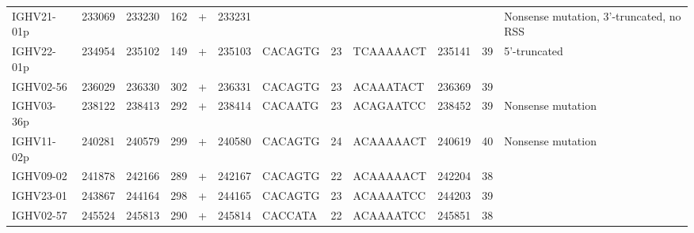 \begin{tabular}{lrrrlrlllrrp{4cm}}
  IGHV21-01p & 233069 & 233230 & 162 & + & 233231 &  &  &  &  &  & Nonsense mutation, 3'-truncated, no RSS \\ 
  IGHV22-01p & 234954 & 235102 & 149 & + & 235103 & CACAGTG & 23 & TCAAAAACT & 235141 & 39 & 5'-truncated \\ 
  IGHV02-56 & 236029 & 236330 & 302 & + & 236331 & CACAGTG & 23 & ACAAATACT & 236369 & 39 &  \\ 
  IGHV03-36p & 238122 & 238413 & 292 & + & 238414 & CACAATG & 23 & ACAGAATCC & 238452 & 39 & Nonsense mutation \\ 
  IGHV11-02p & 240281 & 240579 & 299 & + & 240580 & CACAGTG & 24 & ACAAAAACT & 240619 & 40 & Nonsense mutation \\ 
  IGHV09-02 & 241878 & 242166 & 289 & + & 242167 & CACAGTG & 22 & ACAAAAACT & 242204 & 38 &  \\ 
  IGHV23-01 & 243867 & 244164 & 298 & + & 244165 & CACAGTG & 23 & ACAAAATCC & 244203 & 39 &  \\ 
  IGHV02-57 & 245524 & 245813 & 290 & + & 245814 & CACCATA & 22 & ACAAAATCC & 245851 & 38 &  \\ 
   \bottomrule \end{tabular}

